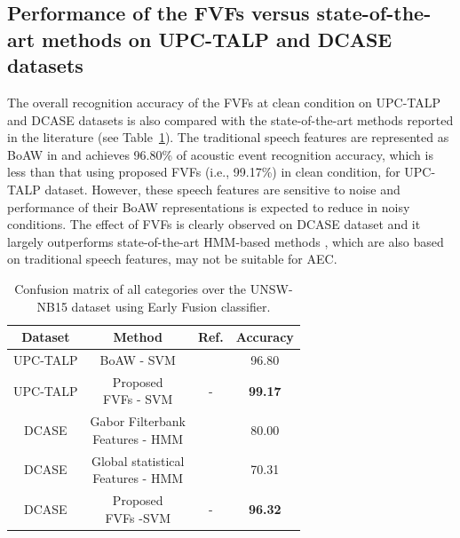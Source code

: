 \documentclass[a4paper]{article}
\begin{document}
\subsection{Performance of the FVFs versus state-of-the-art methods on UPC-TALP and DCASE datasets}
The overall recognition accuracy of the FVFs at clean condition on UPC-TALP and DCASE datasets is also compared with the state-of-the-art methods reported in the literature (see Table~\ref{table2}). 
The traditional speech features are represented as BoAW in \cite{phan2016learn} and achieves 96.80\% of acoustic event recognition accuracy, which is less than that using proposed FVFs (i.e., 99.17\%) in clean condition, for UPC-TALP dataset. However, these speech features are sensitive to noise and performance of their BoAW representations is expected to reduce in noisy conditions. 
The effect of FVFs is clearly observed on DCASE dataset and it largely outperforms state-of-the-art HMM-based methods \cite{schroder2015spectro} \cite{jayalakshmi2018global}, which are also based on traditional speech features, may not be suitable for AEC.   
\begin{table}
	\scriptsize
	\centering
	\caption{Confusion matrix of all categories over the UNSW-NB15 dataset using Early Fusion classifier.}
	\begin{tabular}{|c|c|c|c|}
		\hline
		Dataset & Method & Ref. &Accuracy\\
		\hline
		\hline
	UPC-TALP & BoAW - SVM& \cite{phan2016learn} & 96.80 \\
		\hline
	UPC-TALP & \makecell{Proposed\\ FVFs - SVM} & - & \textbf{99.17} \\
	\hline	
	\hline
	DCASE & \makecell{Gabor Filterbank \\ Features - HMM} & \cite{schroder2015spectro} & 80.00 \\
	\hline
	DCASE & \makecell{Global statistical \\ Features - HMM} & \cite{jayalakshmi2018global} & 70.31 \\
	\hline
		DCASE & \makecell{Proposed\\ FVFs -SVM} & - & \textbf{96.32} \\
		\hline	
	\end{tabular}
	
	\label{table2}
\end{table}
\end{document}
